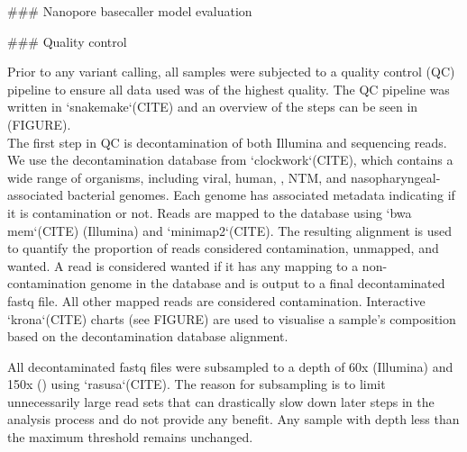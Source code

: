 \begin{markdown}


### Nanopore basecaller model evaluation


### Quality control

Prior to any variant calling, all samples were subjected to a quality control (QC) pipeline to ensure all data used was of the highest quality. The QC pipeline was written in `snakemake`(CITE) and an overview of the steps can be seen in (FIGURE). \\
The first step in QC is decontamination of both Illumina and \ont{} sequencing reads. We use the decontamination database from `clockwork`(CITE), which contains a wide range of organisms, including viral, human, \mtb{}, NTM, and nasopharyngeal-associated bacterial genomes. Each genome has associated metadata indicating if it is contamination or not. Reads are mapped to the database using `bwa mem`(CITE) (Illumina) and `minimap2`(CITE). The resulting alignment is used to quantify the proportion of reads considered contamination, unmapped, and wanted. A read is considered wanted if it has any mapping to a non-contamination genome in the database and is output to a final decontaminated fastq file. All other mapped reads are considered contamination. Interactive `krona`(CITE) charts (see FIGURE) are used to visualise a sample's composition based on the decontamination database alignment.  

All decontaminated fastq files were subsampled to a depth of 60x (Illumina) and 150x (\ont{}) using `rasusa`(CITE). The reason for subsampling is to limit unnecessarily large read sets that can drastically slow down later steps in the analysis process and do not provide any benefit. Any sample with depth less than the maximum threshold remains unchanged.  


\end{markdown}
